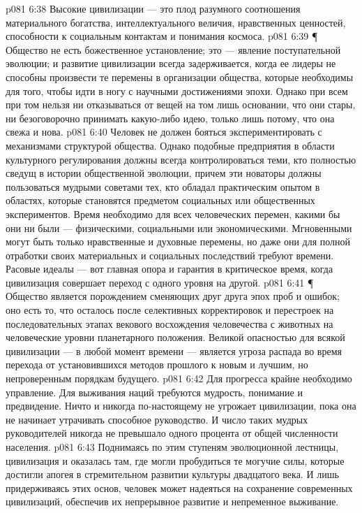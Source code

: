 \vs p081 6:38 Высокие цивилизации --- это плод разумного соотношения материального богатства, интеллектуального величия, нравственных ценностей, способности к социальным контактам и понимания космоса.
\vs p081 6:39 \P\ \bibnobreakspace {} Общество не есть божественное установление; это --- явление поступательной эволюции; и развитие цивилизации всегда задерживается, когда ее лидеры не способны произвести те перемены в организации общества, которые необходимы для того, чтобы идти в ногу с научными достижениями эпохи. Однако при всем при том нельзя ни отказываться от вещей на том лишь основании, что они стары, ни безоговорочно принимать какую\hyp{}либо идею, только лишь потому, что она свежа и нова.
\vs p081 6:40 Человек не должен бояться экспериментировать с механизмами структурой общества. Однако подобные предприятия в области культурного регулирования должны всегда контролироваться теми, кто полностью сведущ в истории общественной эволюции, причем эти новаторы должны пользоваться мудрыми советами тех, кто обладал практическим опытом в областях, которые становятся предметом социальных или общественных экспериментов.  Время необходимо для всех человеческих перемен, какими бы они ни были --- физическими, социальными или экономическими. Мгновенными могут быть только нравственные и духовные перемены, но даже они для полной отработки своих материальных и социальных последствий требуют времени. Расовые идеалы --- вот главная опора и гарантия в критическое время, когда цивилизация совершает переход с одного уровня на другой.
\vs p081 6:41 \P\ \bibnobreakspace {} Общество является порождением сменяющих друг друга эпох проб и ошибок; оно есть то, что осталось после селективных корректировок и перестроек на последовательных этапах векового восхождения человечества с животных на человеческие уровни планетарного положения. Великой опасностью для всякой цивилизации --- в любой момент времени --- является угроза распада во время перехода от установившихся методов прошлого к новым и лучшим, но непроверенным порядкам будущего.
\vs p081 6:42 Для прогресса крайне необходимо управление. Для выживания наций требуются мудрость, понимание и предвидение. Ничто и никогда по\hyp{}настоящему не угрожает цивилизации, пока она не начинает утрачивать способное руководство. И число таких мудрых руководителей никогда не превышало одного процента от общей численности населения.
\vs p081 6:43 Поднимаясь по этим ступеням эволюционной лестницы, цивилизация и оказалась там, где могли пробудиться те могучие силы, которые достигли апогея в стремительном развитии культуры двадцатого века. И лишь придерживаясь этих основ, человек может надеяться на сохранение современных цивилизаций, обеспечив их непрерывное развитие и непременное выживание.
